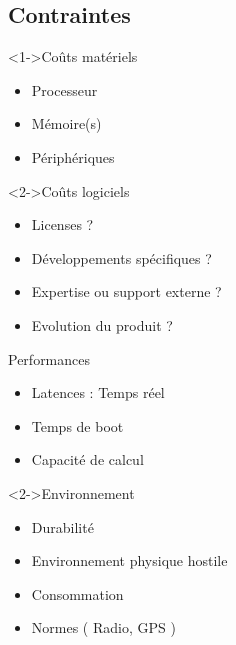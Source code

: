 \subsection{Contraintes}
\begin{frame}[t]
	\begin{block}<1->{Coûts matériels}
		\begin{itemize}
			\item Processeur
			\item Mémoire(s)
			\item Périphériques
		\end{itemize}
	\end{block}
	\begin{block}<2->{Coûts logiciels}
		\begin{itemize}
			\item Licenses ?
			\item Développements spécifiques ?
			\item Expertise ou support externe ?
			\item Evolution du produit ?
		\end{itemize}
	\end{block}
\end{frame}

\begin{frame}[t]
	\begin{block}{Performances}
		\begin{itemize}
			\item Latences : Temps réel
			\item Temps de boot
			\item Capacité de calcul
		\end{itemize}
	\end{block}
	\begin{block}<2->{Environnement}
		\begin{itemize}
			\item Durabilité
			\item Environnement physique hostile
			\item Consommation
			\item Normes ( Radio, GPS )
		\end{itemize}
	\end{block}
\end{frame}

